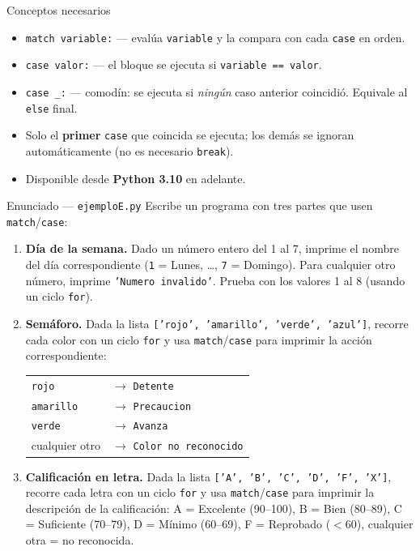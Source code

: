 \documentclass[12pt,a4paper]{article}
\begin{document}
\vspace{0.6em}
\begin{conceptobox}{Conceptos necesarios}
\begin{itemize}
  \item \texttt{match variable:} — evalúa \texttt{variable} y la compara
        con cada \texttt{case} en orden.
  \item \texttt{case valor:} — el bloque se ejecuta si \texttt{variable == valor}.
  \item \texttt{case \_:} — comodín: se ejecuta si \emph{ningún} caso
        anterior coincidió.  Equivale al \texttt{else} final.
  \item Solo el \textbf{primer} \texttt{case} que coincida se ejecuta;
        los demás se ignoran automáticamente (no es necesario \texttt{break}).
  \item Disponible desde \textbf{Python 3.10} en adelante.
\end{itemize}
\end{conceptobox}

\vspace{0.8em}
\begin{enunciadobox}{Enunciado — \texttt{ejemploE.py}}
Escribe un programa con tres partes que usen \texttt{match}/\texttt{case}:

\begin{enumerate}
  \item \textbf{Día de la semana.}
        Dado un número entero del 1 al 7, imprime el nombre del día
        correspondiente (\texttt{1} = Lunes, \ldots, \texttt{7} = Domingo).
        Para cualquier otro número, imprime \texttt{'Numero invalido'}.
        Prueba con los valores 1 al 8 (usando un ciclo \texttt{for}).

  \item \textbf{Semáforo.}
        Dada la lista \texttt{['rojo', 'amarillo', 'verde', 'azul']},
        recorre cada color con un ciclo \texttt{for} y usa
        \texttt{match}/\texttt{case} para imprimir la acción correspondiente:
        \begin{center}
        \begin{tabular}{ll}
          \texttt{rojo} & $\to$ \texttt{Detente} \\
          \texttt{amarillo} & $\to$ \texttt{Precaucion} \\
          \texttt{verde} & $\to$ \texttt{Avanza} \\
          cualquier otro & $\to$ \texttt{Color no reconocido} \\
        \end{tabular}
        \end{center}

  \item \textbf{Calificación en letra.}
        Dada la lista \texttt{['A', 'B', 'C', 'D', 'F', 'X']}, recorre
        cada letra con un ciclo \texttt{for} y usa \texttt{match}/\texttt{case}
        para imprimir la descripción de la calificación:
        A = Excelente (90--100), B = Bien (80--89), C = Suficiente (70--79),
        D = Mínimo (60--69), F = Reprobado ($<$60), cualquier otra = no reconocida.
\end{enumerate}
\end{enunciadobox}
\end{document}
